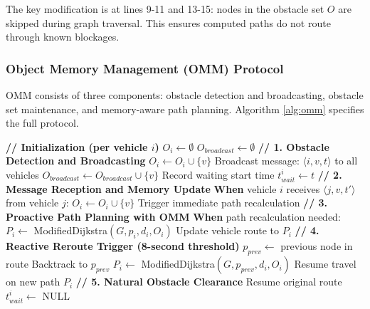 \documentclass[conference]{IEEEtran}
\begin{document}
The key modification is at lines 9-11 and 13-15: nodes in the obstacle set $O$ are skipped during graph traversal. This ensures computed paths do not route through known blockages.

\subsubsection{Object Memory Management (OMM) Protocol}

OMM consists of three components: obstacle detection and broadcasting, obstacle set maintenance, and memory-aware path planning. Algorithm \ref{alg:omm} specifies the full protocol.

\begin{algorithm}[t]
\caption{Object Memory Management (OMM) Protocol}
\label{alg:omm}
\begin{algorithmic}[1]
\STATE \textbf{// Initialization (per vehicle $i$)}
\STATE $O_i \leftarrow \emptyset$ 
\STATE $O_{broadcast} \leftarrow \emptyset$ 
\STATE
\STATE \textbf{// 1. Obstacle Detection and Broadcasting}
    \STATE $O_i \leftarrow O_i \cup \{v\}$ 
        \STATE Broadcast message: $\langle i, v, t \rangle$ to all vehicles
        \STATE $O_{broadcast} \leftarrow O_{broadcast} \cup \{v\}$
    \ENDIF
    \STATE Record waiting start time $t_{wait}^i \leftarrow t$
\ENDIF
\STATE
\STATE \textbf{// 2. Message Reception and Memory Update}
\STATE \textbf{When} vehicle $i$ receives $\langle j, v, t' \rangle$ from vehicle $j$:
\STATE \quad $O_i \leftarrow O_i \cup \{v\}$ 
    \STATE Trigger immediate path recalculation
\ENDIF
\STATE
\STATE \textbf{// 3. Proactive Path Planning with OMM}
\STATE \textbf{When} path recalculation needed:
\STATE \quad $P_i \leftarrow$ ModifiedDijkstra$(G, p_i, d_i, O_i)$
\STATE \quad Update vehicle route to $P_i$
\STATE
\STATE \textbf{// 4. Reactive Reroute Trigger (8-second threshold)}
        \STATE $p_{prev} \leftarrow$ previous node in route
        \STATE Backtrack to $p_{prev}$
        \STATE $P_i \leftarrow$ ModifiedDijkstra$(G, p_{prev}, d_i, O_i)$
        \STATE Resume travel on new path $P_i$
    \ENDIF
\ENDIF
\STATE
\STATE \textbf{// 5. Natural Obstacle Clearance}
    \STATE Resume original route 
    \STATE $t_{wait}^i \leftarrow$ NULL
\ENDIF
\end{algorithmic}
\end{algorithm}
\end{document}
